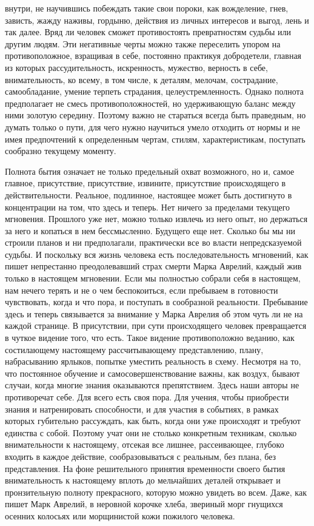 внутри, не научившись побеждать такие свои пороки, как вожделение, гнев,
зависть, жажду наживы, гордыню, действия из личных интересов и выгод, лень и так
далее. Вряд ли человек сможет противостоять превратностям судьбы или другим
людям. Эти негативные черты можно также переселить упором на противоположное,
взращивая в себе, постоянно практикуя добродетели, главная из которых
рассудительность, искренность, мужество, верность в себе, внимательность, ко
всему, в том числе, к деталям, мелочам, сострадание, самообладание, умение
терпеть страдания, целеустремленность. Однако полнота предполагает не смесь
противоположностей, но удерживающую баланс между ними золотую середину. Поэтому
важно не стараться всегда быть праведным, но думать только о пути, для чего
нужно научиться умело отходить от нормы и не имея предпочтений к определенным
чертам, стилям, характеристикам, поступать сообразно текущему моменту. 

Полнота
бытия означает не только предельный охват возможного, но и, самое главное,
присутствие, присутствие, извините, присутствие происходящего в
действительности. Реальное, подлинное, настоящее может быть достигнуто в
концентрации на том, что здесь и теперь. Нет ничего за пределами текущего
мгновения. Прошлого уже нет, можно только извлечь из него опыт, но держаться за
него и копаться в нем бессмысленно. Будущего еще нет. Сколько бы мы ни строили
планов и ни предполагали, практически все во власти непредсказуемой судьбы. И
поскольку вся жизнь человека есть последовательность мгновений, как пишет
непрестанно преодолевавший страх смерти Марка Аврелий, каждый жив только в
настоящем мгновении. Если мы полностью собрали себя в настоящем, нам нечего
терять и не о чем беспокоиться, если пребываем в готовности чувствовать, когда и
что пора, и поступать в сообразной реальности. Пребывание здесь и теперь
связывается за внимание у Марка Аврелия об этом чуть ли не на каждой странице. В
присутствии, при сути происходящего человек превращается в чуткое видение того,
что есть. Такое видение противоположно веданию, как состилающему настоящему
рассчитывающему представлению, плану, набрасыванию ярлыков, попытке уместить
реальность в схему. Несмотря на то, что постоянное обучение и
самосовершенствование важны, как воздух, бывают случаи, когда многие знания
оказываются препятствием. Здесь наши авторы не противоречат себе. Для всего есть
своя пора. Для учения, чтобы приобрести знания и натренировать способности, и
для участия в событиях, в рамках которых губительно рассуждать, как быть, когда
они уже происходят и требуют единства с собой. Поэтому учат они не столько
конкретным техникам, сколько внимательности к настоящему, отсекая все лишнее,
рассеивающее, глубоко входить в каждое действие, сообразовываться с реальным,
без плана, без представления. На фоне решительного принятия временности своего
бытия внимательность к настоящему вплоть до мельчайших деталей открывает и
пронзительную полноту прекрасного, которую можно увидеть во всем. Даже, как
пишет Марк Аврелий, в неровной корочке хлеба, звериный морг гнущихся осенних
колосьях или морщинистой кожи пожилого человека. 

